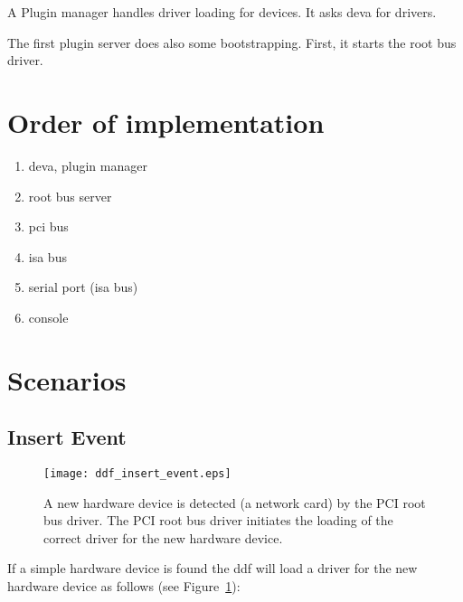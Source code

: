 A Plugin manager handles driver loading for devices.  It asks deva for
drivers.

The first plugin server does also some bootstrapping.  First, it starts
the root bus driver.

\section{Order of implementation}

\begin{enumerate}
\item deva, plugin manager
\item root bus server
\item pci bus
\item isa bus
\item serial port  (isa bus)
\item console 
\end{enumerate}


\section{Scenarios}

\subsection{Insert Event}

\begin{figure}
  \begin{center}
    \leavevmode 
    \texttt{[image: ddf\_insert\_event.eps]}
  \end{center}
  \caption[New hardware detected]{A new hardware device is detected (a
  network card) by the PCI root bus driver.  The PCI root bus driver
  initiates the loading of the correct driver for the new hardware
  device.}
  \label{fig:ddf_insert_event}
\end{figure}

If a simple hardware device is found the ddf will load a driver for
the new hardware device as follows (see Figure~\ref{fig:ddf_insert_event}):

